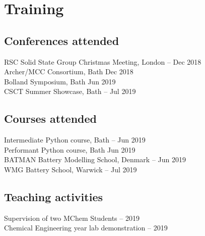\section*{Training}
\thispagestyle{plain}
\subsection*{Conferences attended}
RSC Solid State Group Christmas Meeting, London \dotfill {}-- Dec 2018\\
Archer/MCC Consortium, Bath \dotfill {} Dec 2018\\
Bolland Symposium, Bath \dotfill {} Jun 2019\\
CSCT Summer Showcase, Bath \dotfill {}-- Jul 2019

\subsection*{Courses attended}
Intermediate Python course, Bath \dotfill {}-- Jun 2019\\
Performant Python course, Bath \dotfill {} Jun 2019\\
BATMAN Battery Modelling School, Denmark \dotfill {}-- Jun 2019\\
WMG Battery School, Warwick \dotfill {}-- Jul 2019

\subsection*{Teaching activities}
Supervision of two MChem Students  -- 2019\\
Chemical Engineering  year lab demonstration  -- 2019\\